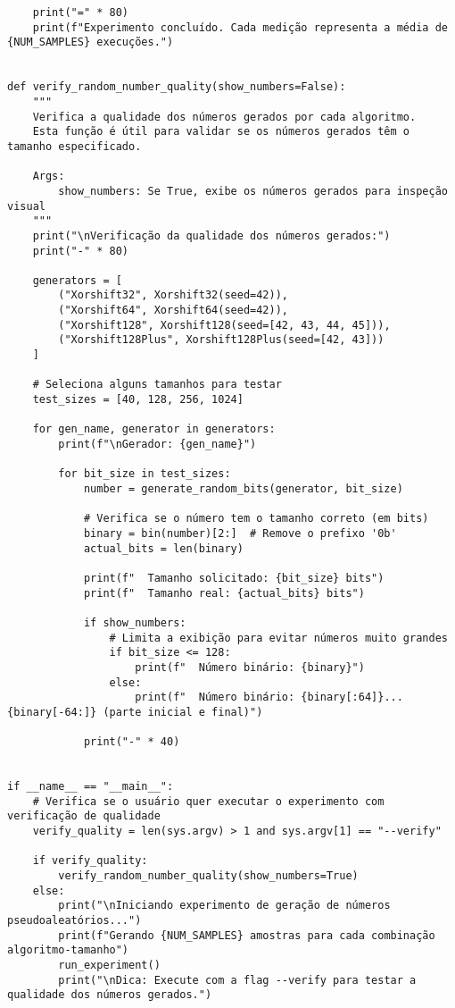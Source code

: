 \begin{verbatim}
    print("=" * 80)
    print(f"Experimento concluído. Cada medição representa a média de {NUM_SAMPLES} execuções.")


def verify_random_number_quality(show_numbers=False):
    """
    Verifica a qualidade dos números gerados por cada algoritmo.
    Esta função é útil para validar se os números gerados têm o tamanho especificado.
    
    Args:
        show_numbers: Se True, exibe os números gerados para inspeção visual
    """
    print("\nVerificação da qualidade dos números gerados:")
    print("-" * 80)
    
    generators = [
        ("Xorshift32", Xorshift32(seed=42)),
        ("Xorshift64", Xorshift64(seed=42)),
        ("Xorshift128", Xorshift128(seed=[42, 43, 44, 45])),
        ("Xorshift128Plus", Xorshift128Plus(seed=[42, 43]))
    ]
    
    # Seleciona alguns tamanhos para testar
    test_sizes = [40, 128, 256, 1024]
    
    for gen_name, generator in generators:
        print(f"\nGerador: {gen_name}")
        
        for bit_size in test_sizes:
            number = generate_random_bits(generator, bit_size)
            
            # Verifica se o número tem o tamanho correto (em bits)
            binary = bin(number)[2:]  # Remove o prefixo '0b'
            actual_bits = len(binary)
            
            print(f"  Tamanho solicitado: {bit_size} bits")
            print(f"  Tamanho real: {actual_bits} bits")
            
            if show_numbers:
                # Limita a exibição para evitar números muito grandes
                if bit_size <= 128:
                    print(f"  Número binário: {binary}")
                else:
                    print(f"  Número binário: {binary[:64]}...{binary[-64:]} (parte inicial e final)")
            
            print("-" * 40)


if __name__ == "__main__":
    # Verifica se o usuário quer executar o experimento com verificação de qualidade
    verify_quality = len(sys.argv) > 1 and sys.argv[1] == "--verify"
    
    if verify_quality:
        verify_random_number_quality(show_numbers=True)
    else:
        print("\nIniciando experimento de geração de números pseudoaleatórios...")
        print(f"Gerando {NUM_SAMPLES} amostras para cada combinação algoritmo-tamanho")
        run_experiment()
        print("\nDica: Execute com a flag --verify para testar a qualidade dos números gerados.")
\end{verbatim}
